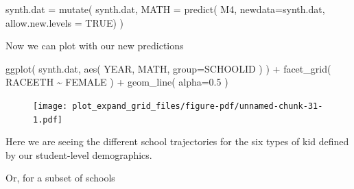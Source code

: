 \documentclass[
  letterpaper,
  DIV=11,
  numbers=noendperiod]{scrreprt}
\newenvironment{Shaded}{\begin{snugshade}}{\end{snugshade}}
\newcommand{\AttributeTok}[1]{\textcolor[rgb]{0.49,0.56,0.16}{#1}}
\newcommand{\ConstantTok}[1]{\textcolor[rgb]{0.53,0.00,0.00}{#1}}
\newcommand{\DecValTok}[1]{\textcolor[rgb]{0.25,0.63,0.44}{#1}}
\newcommand{\FloatTok}[1]{\textcolor[rgb]{0.25,0.63,0.44}{#1}}
\newcommand{\FunctionTok}[1]{\textcolor[rgb]{0.02,0.16,0.49}{#1}}
\newcommand{\NormalTok}[1]{\textcolor[rgb]{0.00,0.44,0.13}{#1}}
\newcommand{\OtherTok}[1]{\textcolor[rgb]{0.00,0.44,0.13}{#1}}
\newcommand{\SpecialCharTok}[1]{\textcolor[rgb]{0.25,0.44,0.63}{#1}}
\newcommand{\StringTok}[1]{\textcolor[rgb]{0.25,0.44,0.63}{#1}}
\begin{document}
\begin{Shaded}
\begin{Highlighting}[]
\NormalTok{synth.dat }\OtherTok{=} \FunctionTok{mutate}\NormalTok{( synth.dat, }\AttributeTok{MATH =} \FunctionTok{predict}\NormalTok{( M4, }
                                               \AttributeTok{newdata=}\NormalTok{synth.dat,}
                                               \AttributeTok{allow.new.levels =} \ConstantTok{TRUE}\NormalTok{) )}
\end{Highlighting}
\end{Shaded}

Now we can plot with our new predictions

\begin{Shaded}
\begin{Highlighting}[]
\FunctionTok{ggplot}\NormalTok{( synth.dat, }\FunctionTok{aes}\NormalTok{( YEAR, MATH, }\AttributeTok{group=}\NormalTok{SCHOOLID ) ) }\SpecialCharTok{+}
  \FunctionTok{facet\_grid}\NormalTok{( RACEETH }\SpecialCharTok{\textasciitilde{}}\NormalTok{ FEMALE ) }\SpecialCharTok{+}
  \FunctionTok{geom\_line}\NormalTok{( }\AttributeTok{alpha=}\FloatTok{0.5}\NormalTok{ )}
\end{Highlighting}
\end{Shaded}

\begin{figure}[H]

{\centering \texttt{[image: plot\_expand\_grid\_files/figure-pdf/unnamed-chunk-31-1.pdf]}

}

\end{figure}

Here we are seeing the different school trajectories for the six types
of kid defined by our student-level demographics.

Or, for a subset of schools

\begin{Shaded}
\end{Shaded}
\end{document}
